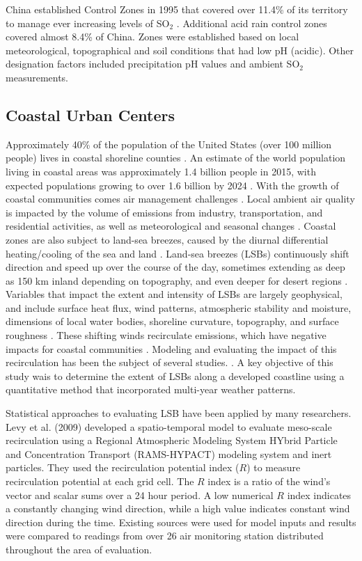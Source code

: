 China established Control Zones in 1995 that covered over 11.4\% of its territory to manage ever increasing levels of SO$_{2}$ \citep{Hao2000}.  Additional acid rain control zones covered almost 8.4\% of China.  Zones were established based on local meteorological, topographical and soil conditions that had low pH (acidic).  Other designation factors included precipitation pH values and ambient SO$_{2}$ measurements.

\subsection{Coastal Urban Centers}

Approximately 40\% of the population of the United States (over 100 million people) lives in coastal shoreline counties \citep{NOAA2013}.  An estimate of the world population living in coastal areas was approximately 1.4 billion people in 2015, with expected populations growing  to over 1.6 billion by 2024 \citep{Geohive2015}.  With the growth of coastal communities comes air management challenges \citep{Gamas2015}.  Local ambient air quality is impacted by the volume of emissions from industry, transportation, and residential activities, as well as meteorological and seasonal changes \citep{Fiore2015, Kimbrough2013}.  Coastal zones are also subject to land-sea breezes, caused by the diurnal differential heating/cooling of the sea and land \citep{Crosman2010, Cuxart2014, Tsai2011}.  Land-sea breezes (LSBs) continuously shift direction and speed up over the course of the day, sometimes extending as deep as 150 km inland depending on topography, and even deeper for desert regions \citep{Miao2015, Zhu2004}.  Variables that impact the extent and intensity of LSBs are largely geophysical, and include surface heat flux, wind patterns, atmospheric stability and moisture, dimensions of local water bodies, shoreline curvature, topography, and surface roughness \citep{Crosman2010, Lu1995}.  These shifting winds recirculate emissions, which have negative impacts for coastal communities \citep{Lu1996}.  Modeling and evaluating the impact of this recirculation has been the subject of several studies. \citep{Crosman2010, Levy2009, Wu2013, Zhu2004}.  A key objective of this study wais to determine the extent of LSBs along a developed coastline using a quantitative method that incorporated multi-year weather patterns. 

Statistical approaches to evaluating LSB have been applied by many researchers.  Levy et al. (2009) developed a spatio-temporal model to evaluate meso-scale recirculation using a Regional Atmospheric Modeling System HYbrid Particle and Concentration Transport (RAMS-HYPACT) modeling system and inert particles.  They used the recirculation potential index ($R$) to measure recirculation potential at each grid cell.  The $R$ index is a ratio of the wind’s vector and scalar sums over a 24 hour period.  A low numerical $R$ index indicates a constantly changing wind direction, while a high value indicates constant wind direction during the time.  Existing sources were used for model inputs and results were compared to readings from over 26 air monitoring station distributed throughout the area of evaluation.  


